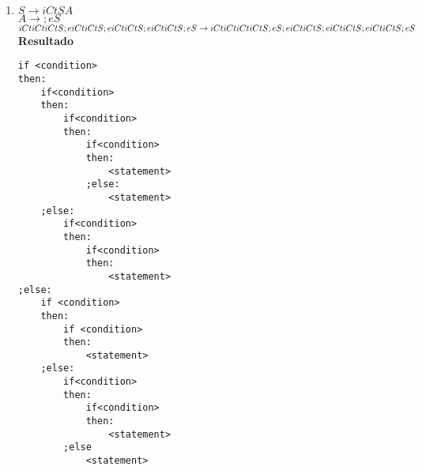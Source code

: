 \documentclass[12pt,letterpaper]{article}
\begin{document}
\begin{enumerate}
\item $S \rightarrow iCtSA$ \\ $A \rightarrow ;eS$ \\
$iCtiCtiCtS;eiCtiCtS;eiCtiCtS;eiCtiCtS;eS \rightarrow \\ iCtiCtiCtiCtS;eS;eiCtiCtS;eiCtiCtS;eiCtiCtS;eS$\\
\newpage
\textbf{Resultado}

\lstset{language=Python, breaklines=true, basicstyle=\footnotesize}
\begin{lstlisting}[frame=single]
if <condition>
then:
	if<condition>
	then:
		if<condition>
		then:
			if<condition>
			then:
				<statement>
			;else:
				<statement>
	;else:
		if<condition>
		then:
			if<condition>
			then:
				<statement>
;else:
	if <condition>
	then:
		if <condition>
		then:
			<statement>
	;else:
		if<condition>
		then:
			if<condition>
			then:
				<statement>
		;else
			<statement>

\end{lstlisting}


\end{enumerate}
\end{document}
